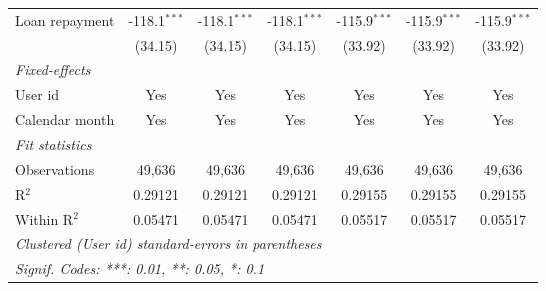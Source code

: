 \begin{table}[htbp]
\begin{footnotesize}
\begin{tabular}{lcccccc}
         Loan repayment                   & -118.1$^{***}$ & -118.1$^{***}$ & -118.1$^{***}$ & -115.9$^{***}$ & -115.9$^{***}$ & -115.9$^{***}$\\
                                          & (34.15)        & (34.15)        & (34.15)        & (33.92)        & (33.92)        & (33.92)\\
         \midrule \emph{Fixed-effects} &   &   &   &   &   &  \\
         User id                          & Yes            & Yes            & Yes            & Yes            & Yes            & Yes\\
         Calendar month                   & Yes            & Yes            & Yes            & Yes            & Yes            & Yes\\
         \midrule \emph{Fit statistics} &   &   &   &   &   &  \\
         Observations                     & 49,636         & 49,636         & 49,636         & 49,636         & 49,636         & 49,636\\
         R$^2$                            & 0.29121        & 0.29121        & 0.29121        & 0.29155        & 0.29155        & 0.29155\\
         Within R$^2$                     & 0.05471        & 0.05471        & 0.05471        & 0.05517        & 0.05517        & 0.05517\\
         \midrule\midrule\multicolumn{7}{l}{\emph{Clustered (User id) standard-errors in parentheses}}\\
         \multicolumn{7}{l}{\emph{Signif. Codes: ***: 0.01, **: 0.05, *: 0.1}}\\
      \end{tabular}
   \end{footnotesize}
\end{table}


